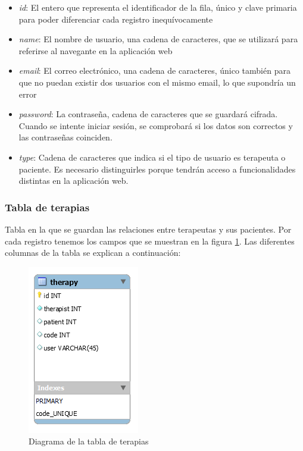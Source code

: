 \begin{itemize}
	\item \textit{id}: El entero que representa el identificador de la fila, único y clave primaria para poder diferenciar cada registro inequívocamente
	\item \textit{name}: El nombre de usuario, una cadena de caracteres, que se utilizará para referirse al navegante en la aplicación web
	\item \textit{email}: El correo electrónico, una cadena de caracteres, único también para que no puedan existir dos usuarios con el mismo email, lo que supondría un error
	\item \textit{password}: La contraseña, cadena de caracteres que se guardará cifrada. Cuando se intente iniciar sesión, se comprobará si los datos son correctos y las contraseñas coinciden.
	\item \textit{type}: Cadena de caracteres que indica si el tipo de usuario es terapeuta o paciente. Es necesario distinguirles porque tendrán acceso a funcionalidades distintas en la aplicación web.
\end{itemize}

\subsubsection{Tabla de terapias}
Tabla en la que se guardan las relaciones entre terapeutas y sus pacientes. Por cada registro tenemos los campos que se muestran en la figura \ref{fig:diagramatablatherapy}. Las diferentes columnas de la tabla se explican a continuación:

\begin{figure}[h]
	\centering
	\includegraphics[scale=1.0]{Imagenes/Vectorial/diagrama_tabla_therapy}
	\caption{Diagrama de la tabla de terapias}
	\label{fig:diagramatablatherapy}
\end{figure}


